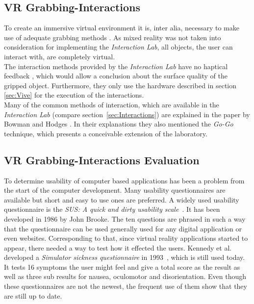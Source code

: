 \subsection{VR Grabbing-Interactions}\label{sec:SOTAInteractions}
To create an immersive virtual environment it is, inter alia, necessary to make use of adequate grabbing methods \cite{Bowman}. As mixed reality was not taken into consideration for implementing the \textit{Interaction Lab}, all objects, the user can interact with, are completely virtual. \\
The interaction methods provided by the \textit{Interaction Lab} have no haptical feedback \cite{768179}, which would allow a conclusion about the surface quality of the gripped object. Furthermore, they only use the hardware described in section \ref{sec:Vive} for the execution of the interactions. \\
Many of the common methods of interaction, which are available in the \textit{Interaction Lab} (compare section~\ref {sec:Interactions}) are explained in the paper by Bowman and Hodges \cite{Bowman}. In their explanations they also mentioned the  \textit{Go-Go} technique, which presents a conceivable extension of the laboratory.

\subsection{VR Grabbing-Interactions Evaluation}\label{sec:SOTAInteractionEvalution}

To determine usability of computer based applications has been a problem from the start of the computer development. Many usability questionnaires are available but short and easy to use ones are preferred. A widely used usability questionnaire is the \textit{SUS: A quick and dirty usability scale}~\cite{6sus}. It has been developed in 1986 by John Brooke. The ten questions are phrased in such a way that the questionnaire can be used generally used for any digital application or even websites. 
Corresponding to that, since virtual reality applications started to appear, there needed a way to test how it effected the users. Kennedy et al. developed a \textit{Simulator sickness questionnaire} in 1993~\cite{ssq}, which is still used today. It tests 16 symptoms the user might feel and give a total score as the result as well as three sub results for nausea, oculomotor and disorientation. Even though these questionnaires are not the newest, the frequent use of them show that they are still up to date. 

\newpage
